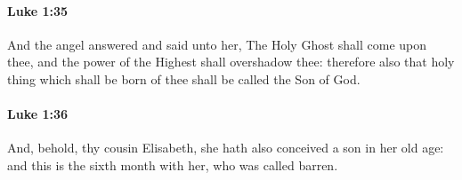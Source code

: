 		\paragraph{Luke 1:35} %
			\label{LUKE-1-35}

			And the angel answered and said unto her, The Holy Ghost shall come upon thee, and the power of the Highest shall overshadow thee: therefore also that holy thing which shall be born of thee shall be called the Son of God.

			\begin{framed}
			\scriptsize
				\begin{compactdesc}
					\item[SBLG] 
				\end{compactdesc}
			\end{framed}

		\paragraph{Luke 1:36} %
			\label{LUKE-1-36}

			And, behold, thy cousin Elisabeth, she hath also conceived a son in her old age: and this is the sixth month with her, who was called barren.

